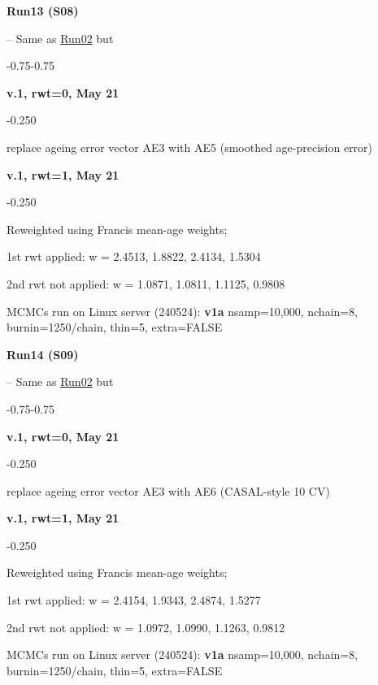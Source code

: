 \hypertarget{R13}{\textbf{Run13 (S08)}} -- Same as \hyperlink{R02}{Run02} but
\begin{itemize_csas}{-0.75}{-0.75}
	\item \textbf{v.1, rwt=0, May 21}
	\begin{itemize_csas}{-0.25}{0}
		\item replace ageing error vector AE3 with AE5 (smoothed age-precision error)
	\end{itemize_csas}
	\item \textbf{v.1, rwt=1, May 21}
	\begin{itemize_csas}{-0.25}{0}
		\item Reweighted using Francis mean-age weights;
		\item 1st rwt applied: w = 2.4513, 1.8822, 2.4134, 1.5304
		\item 2nd rwt not applied: w = 1.0871, 1.0811, 1.1125, 0.9808
		\item MCMCs run on Linux server (240524): \textbf{v1a} nsamp=10,000, nchain=8, burnin=1250/chain, thin=5, extra=FALSE
	\end{itemize_csas}
\end{itemize_csas}

\hypertarget{R14}{\textbf{Run14 (S09)}} -- Same as \hyperlink{R02}{Run02} but
\begin{itemize_csas}{-0.75}{-0.75}
	\item \textbf{v.1, rwt=0, May 21}
	\begin{itemize_csas}{-0.25}{0}
		\item replace ageing error vector AE3 with AE6 (CASAL-style 10\pc{} CV)
	\end{itemize_csas}
	\item \textbf{v.1, rwt=1, May 21}
	\begin{itemize_csas}{-0.25}{0}
		\item Reweighted using Francis mean-age weights;
		\item 1st rwt applied: w = 2.4154, 1.9343, 2.4874, 1.5277
		\item 2nd rwt not applied: w = 1.0972, 1.0990, 1.1263, 0.9812
		\item MCMCs run on Linux server (240524): \textbf{v1a} nsamp=10,000, nchain=8, burnin=1250/chain, thin=5, extra=FALSE
	\end{itemize_csas}
\end{itemize_csas}

